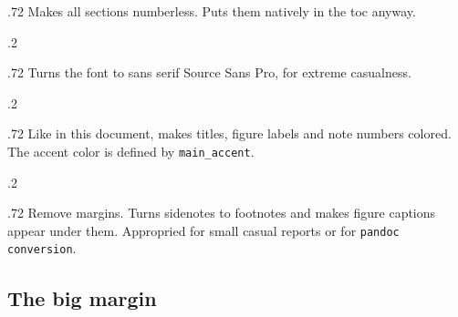 \documentclass[raggedright, twoside, 11pt, colorful]{tufte-style-article}
\begin{document}
\begin{minipagewithmarginpars}[t]{.72\textwidth}
	Makes all sections numberless. Puts them natively in the toc anyway.
\end{minipagewithmarginpars}
\smallskip
\begin{minipagewithmarginpars}[t]{.2\textwidth}
	\raggedleft
\end{minipagewithmarginpars}\hfill%
\begin{minipagewithmarginpars}[t]{.72\textwidth}
	Turns the font to sans serif Source Sans Pro, for extreme casualness.
\end{minipagewithmarginpars}
\smallskip
\begin{minipagewithmarginpars}[t]{.2\textwidth}
	\raggedleft
\end{minipagewithmarginpars}\hfill%
\begin{minipagewithmarginpars}[t]{.72\textwidth}
	Like in this document, makes titles, figure labels and note numbers colored. The accent color is defined by \texttt{main\_accent}.
\end{minipagewithmarginpars}
\smallskip
\begin{minipagewithmarginpars}[t]{.2\textwidth}
	\raggedleft
\end{minipagewithmarginpars}\hfill%
\begin{minipagewithmarginpars}[t]{.72\textwidth}
	Remove margins. Turns sidenotes to footnotes and makes figure captions appear under them. Appropried for small casual reports or for \texttt{pandoc conversion}.
\end{minipagewithmarginpars}


\newpage

\subsection{The big margin}
\end{document}
